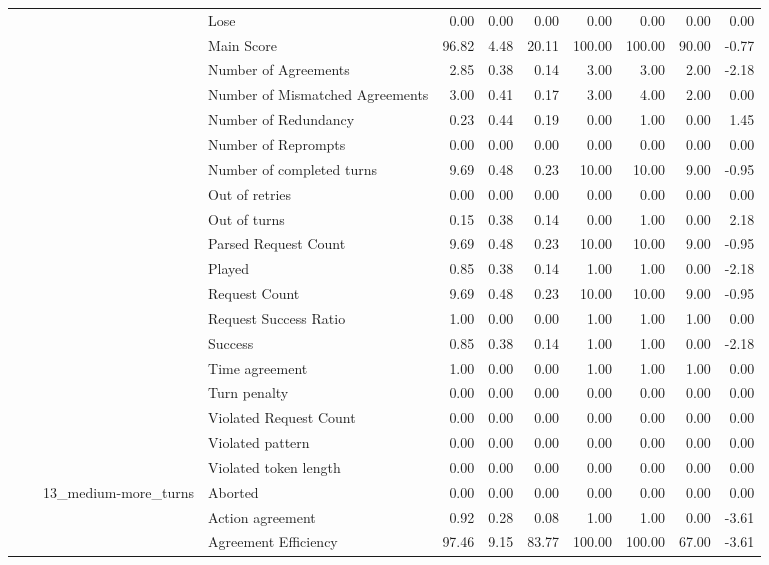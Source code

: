 \begin{tabular}{llllrrrrrrr}
 &  &  & Lose & 0.00 & 0.00 & 0.00 & 0.00 & 0.00 & 0.00 & 0.00 \\
 &  &  & Main Score & 96.82 & 4.48 & 20.11 & 100.00 & 100.00 & 90.00 & -0.77 \\
 &  &  & Number of Agreements & 2.85 & 0.38 & 0.14 & 3.00 & 3.00 & 2.00 & -2.18 \\
 &  &  & Number of Mismatched Agreements & 3.00 & 0.41 & 0.17 & 3.00 & 4.00 & 2.00 & 0.00 \\
 &  &  & Number of Redundancy & 0.23 & 0.44 & 0.19 & 0.00 & 1.00 & 0.00 & 1.45 \\
 &  &  & Number of Reprompts & 0.00 & 0.00 & 0.00 & 0.00 & 0.00 & 0.00 & 0.00 \\
 &  &  & Number of completed turns & 9.69 & 0.48 & 0.23 & 10.00 & 10.00 & 9.00 & -0.95 \\
 &  &  & Out of retries & 0.00 & 0.00 & 0.00 & 0.00 & 0.00 & 0.00 & 0.00 \\
 &  &  & Out of turns & 0.15 & 0.38 & 0.14 & 0.00 & 1.00 & 0.00 & 2.18 \\
 &  &  & Parsed Request Count & 9.69 & 0.48 & 0.23 & 10.00 & 10.00 & 9.00 & -0.95 \\
 &  &  & Played & 0.85 & 0.38 & 0.14 & 1.00 & 1.00 & 0.00 & -2.18 \\
 &  &  & Request Count & 9.69 & 0.48 & 0.23 & 10.00 & 10.00 & 9.00 & -0.95 \\
 &  &  & Request Success Ratio & 1.00 & 0.00 & 0.00 & 1.00 & 1.00 & 1.00 & 0.00 \\
 &  &  & Success & 0.85 & 0.38 & 0.14 & 1.00 & 1.00 & 0.00 & -2.18 \\
 &  &  & Time agreement & 1.00 & 0.00 & 0.00 & 1.00 & 1.00 & 1.00 & 0.00 \\
 &  &  & Turn penalty & 0.00 & 0.00 & 0.00 & 0.00 & 0.00 & 0.00 & 0.00 \\
 &  &  & Violated Request Count & 0.00 & 0.00 & 0.00 & 0.00 & 0.00 & 0.00 & 0.00 \\
 &  &  & Violated pattern & 0.00 & 0.00 & 0.00 & 0.00 & 0.00 & 0.00 & 0.00 \\
 &  &  & Violated token length & 0.00 & 0.00 & 0.00 & 0.00 & 0.00 & 0.00 & 0.00 \\
\cline{3-11}
 &  & \multirow[t]{27}{*}{13_medium-more_turns} & Aborted & 0.00 & 0.00 & 0.00 & 0.00 & 0.00 & 0.00 & 0.00 \\
 &  &  & Action agreement & 0.92 & 0.28 & 0.08 & 1.00 & 1.00 & 0.00 & -3.61 \\
 &  &  & Agreement Efficiency & 97.46 & 9.15 & 83.77 & 100.00 & 100.00 & 67.00 & -3.61 \\

\end{tabular}
